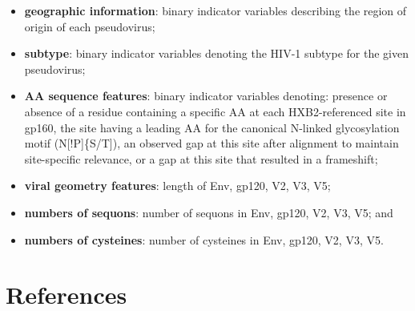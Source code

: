 \documentclass[]{article}
\providecommand{\tightlist}{%
  \setlength{\itemsep}{0pt}\setlength{\parskip}{0pt}}
\begin{document}
\begin{itemize}
\tightlist
\item
  \textbf{geographic information}: binary indicator variables describing
  the region of origin of each pseudovirus;
\item
  \textbf{subtype}: binary indicator variables denoting the HIV-1
  subtype for the given pseudovirus;
\item
  \textbf{AA sequence features}: binary indicator variables denoting:
  presence or absence of a residue containing a specific AA at each
  HXB2-referenced site in gp160, the site having a leading AA for the
  canonical N-linked glycosylation motif (N{[}!P{]}\{S/T{]}), an
  observed gap at this site after alignment to maintain site-specific
  relevance, or a gap at this site that resulted in a frameshift;
\item
  \textbf{viral geometry features}: length of Env, gp120, V2, V3, V5;
\item
  \textbf{numbers of sequons}: number of sequons in Env, gp120, V2, V3,
  V5; and
\item
  \textbf{numbers of cysteines}: number of cysteines in Env, gp120, V2,
  V3, V5.
\end{itemize}

\section{References}\label{sec:refs}


\end{document}
